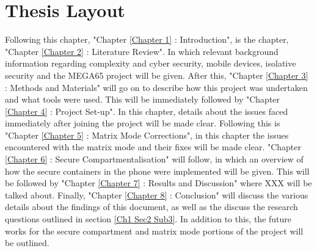 
\section{Thesis Layout}

\label{Ch1 Sec3}

Following this chapter, "Chapter \ref{Chapter 1} : Introduction", is the chapter, "Chapter \ref{Chapter 2} : Literature Review".
In which relevant background information regarding complexity and cyber security, mobile devices, isolative security and the MEGA65 project will be given.
After this, "Chapter \ref{Chapter 3} : Methods and Materials" will go on to describe how this project was undertaken and what tools were used.
This will be immediately followed by "Chapter \ref{Chapter 4} : Project Set-up".
In this chapter, details about the issues faced immediately after joining the project will be made clear.
Following this is "Chapter \ref{Chapter 5} : Matrix Mode Corrections", in this chapter the issues encountered with the matrix mode and their fixes will be made clear.
"Chapter \ref{Chapter 6} : Secure Compartmentalisation" will follow, in which an overview of how the secure containers in the phone were implemented will be given.
This will be followed by "Chapter \ref{Chapter 7} : Results and Discussion" where XXX will be talked about.
Finally, "Chapter \ref{Chapter 8} : Conclusion" will discuss the various details about the findings of this document, as well as the discuss the research questions outlined in section \ref{Ch1 Sec2 Sub3}. In addition to this, the future works for the secure compartment and matrix mode portions of the project will be outlined.


